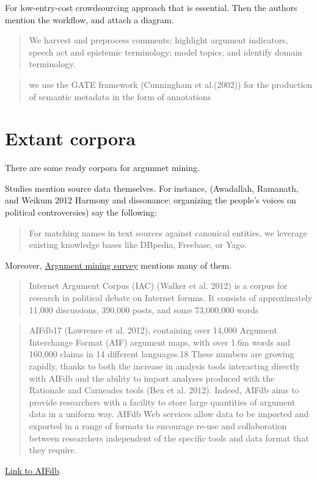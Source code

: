 \documentclass{article}
\begin{document}
For low-entry-cost crowdsourcing approach that is essential.
Then the authors mention the workflow, and attach a diagram.
\begin{quote}
 We harvest and preprocess comments; highlight argument indicators, speech act and epistemic terminology; model topics; and identify domain terminology.
\end{quote}
\begin{quote}
 we use the GATE framework (Cunningham et al.(2002)) for the production of semantic metadata in the form of annotations
\end{quote}

\section{Extant corpora}
There are some ready corpora for argumnet mining.

Studies mention source data themselves. 
For instance, (Awadallah, Ramanath, and Weikum 2012 Harmony and dissonance: organizing the people's voices on political controversies)
say the following:
\begin{quote}
 For matching names in text sources against canonical entities, we leverage existing knowledge bases like DBpedia, Freebase, or Yago.
\end{quote}

Moreover, \href{https://direct.mit.edu/coli/article/45/4/765/93362/Argument-Mining-A-Survey}{Argument mining survey} mentions many of them.
\begin{quote}
 Internet Argument Corpus (IAC) (Walker et al. 2012) is a corpus for research in political debate on Internet forums. It consists of approximately 11,000 discussions, 390,000 posts, and some 73,000,000 words
\end{quote}
\begin{quote}
 AIFdb17 (Lawrence et al. 2012), containing over 14,000 Argument Interchange Format (AIF) argument maps, with over 1.6m words and 160,000 claims in 14 different languages.18 These numbers are growing rapidly, thanks to both the increase in analysis tools interacting directly with AIFdb and the ability to import analyses produced with the Rationale and Carneades tools (Bex et al. 2012). Indeed, AIFdb aims to provide researchers with a facility to store large quantities of argument data in a uniform way. AIFdb Web services allow data to be imported and exported in a range of formats to encourage re-use and collaboration between researchers independent of the specific tools and data format that they require.
\end{quote}
\href{https://corpora.aifdb.org/}{Link to AIFdb}.
\end{document}
